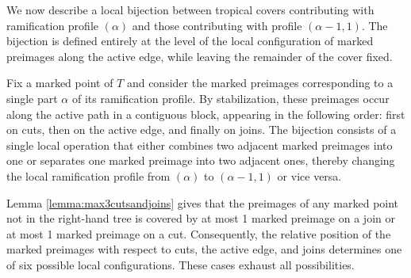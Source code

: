 \documentclass[11pt,reqno]{amsart}
\theoremstyle{definition}
\begin{document}
We now describe a local bijection between tropical covers contributing with ramification
profile $(\alpha)$ and those contributing with profile $(\alpha-1,1)$. The bijection is defined
entirely at the level of the local configuration of marked preimages along the active edge, while
leaving the remainder of the cover fixed.

Fix a marked point of $T$ and consider the marked preimages corresponding to a single part
$\alpha$ of its ramification profile. By stabilization, these preimages occur along the active
path in a contiguous block, appearing in the following order: first on cuts, then on the active
edge, and finally on joins. The bijection consists of a single local operation that either combines
two adjacent marked preimages into one or separates one marked preimage into two adjacent
ones, thereby changing the local ramification profile from $(\alpha)$ to $(\alpha-1,1)$ or vice
versa.

Lemma \ref{lemma:max3cutsandjoins} gives that the preimages of any marked point not in the right-hand tree is covered by at most 1 marked preimage on a join or at most 1 marked preimage on a cut. Consequently, the relative position of
the marked preimages with respect to cuts, the active edge, and joins determines one of six
possible local configurations. These cases exhaust all possibilities.
\end{document}
